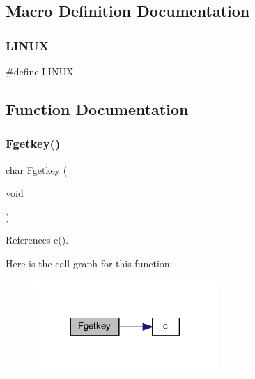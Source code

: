 \subsection{Macro Definition Documentation}
\mbox{\label{C-M__getkey_8c_a157a956e14c5c44b3f73ef23a4776f64}} 
\subsubsection{\texorpdfstring{L\+I\+N\+UX}{LINUX}}
{\footnotesize\ttfamily \#define L\+I\+N\+UX}



\subsection{Function Documentation}
\mbox{\label{C-M__getkey_8c_a257d1f3a5480d15d83e0bf1d43647afc}} 
\subsubsection{\texorpdfstring{Fgetkey()}{Fgetkey()}}
{\footnotesize\ttfamily char Fgetkey (\begin{DoxyParamCaption}\item[{void}]{ }\end{DoxyParamCaption})}



References c().

Here is the call graph for this function\+:
\nopagebreak
\begin{figure}[H]
\begin{center}
\leavevmode
\includegraphics[width=197pt]{C-M__getkey_8c_a257d1f3a5480d15d83e0bf1d43647afc_cgraph}
\end{center}
\end{figure}
